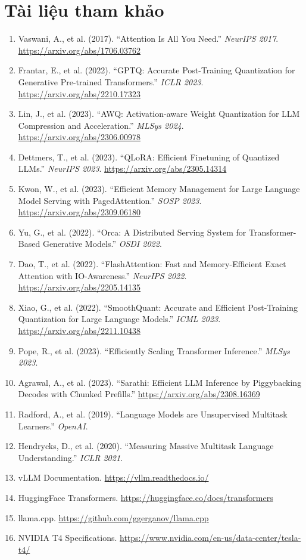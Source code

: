 \documentclass[12pt,a4paper]{report}
\begin{document}
\chapter{Tài liệu tham khảo}

\begin{enumerate}
  \item Vaswani, A., et al. (2017). ``Attention Is All You Need.'' \textit{NeurIPS 2017}. \url{https://arxiv.org/abs/1706.03762}
  \item Frantar, E., et al. (2022). ``GPTQ: Accurate Post-Training Quantization for Generative Pre-trained Transformers.'' \textit{ICLR 2023}. \url{https://arxiv.org/abs/2210.17323}
  \item Lin, J., et al. (2023). ``AWQ: Activation-aware Weight Quantization for LLM Compression and Acceleration.'' \textit{MLSys 2024}. \url{https://arxiv.org/abs/2306.00978}
  \item Dettmers, T., et al. (2023). ``QLoRA: Efficient Finetuning of Quantized LLMs.'' \textit{NeurIPS 2023}. \url{https://arxiv.org/abs/2305.14314}
  \item Kwon, W., et al. (2023). ``Efficient Memory Management for Large Language Model Serving with PagedAttention.'' \textit{SOSP 2023}. \url{https://arxiv.org/abs/2309.06180}
  \item Yu, G., et al. (2022). ``Orca: A Distributed Serving System for Transformer-Based Generative Models.'' \textit{OSDI 2022}.
  \item Dao, T., et al. (2022). ``FlashAttention: Fast and Memory-Efficient Exact Attention with IO-Awareness.'' \textit{NeurIPS 2022}. \url{https://arxiv.org/abs/2205.14135}
  \item Xiao, G., et al. (2022). ``SmoothQuant: Accurate and Efficient Post-Training Quantization for Large Language Models.'' \textit{ICML 2023}. \url{https://arxiv.org/abs/2211.10438}
  \item Pope, R., et al. (2023). ``Efficiently Scaling Transformer Inference.'' \textit{MLSys 2023}.
  \item Agrawal, A., et al. (2023). ``Sarathi: Efficient LLM Inference by Piggybacking Decodes with Chunked Prefills.'' \url{https://arxiv.org/abs/2308.16369}
  \item Radford, A., et al. (2019). ``Language Models are Unsupervised Multitask Learners.'' \textit{OpenAI}.
  \item Hendrycks, D., et al. (2020). ``Measuring Massive Multitask Language Understanding.'' \textit{ICLR 2021}.
  \item vLLM Documentation. \url{https://vllm.readthedocs.io/}
  \item HuggingFace Transformers. \url{https://huggingface.co/docs/transformers}
  \item llama.cpp. \url{https://github.com/ggerganov/llama.cpp}
  \item NVIDIA T4 Specifications. \url{https://www.nvidia.com/en-us/data-center/tesla-t4/}
\end{enumerate}
\end{document}
